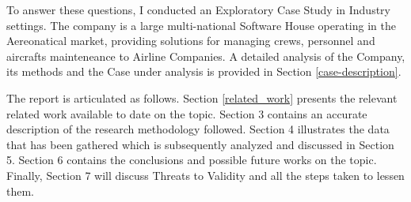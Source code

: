 To answer these questions, I conducted an Exploratory Case Study in Industry settings. The company is a large multi-national Software House operating in the Aereonatical market, providing solutions for managing crews, personnel and aircrafts mainteneance to Airline Companies. A detailed analysis of the Company, its methods and the Case under analysis is provided in Section \ref{case-description}.

The report is articulated as follows. Section \ref{related_work} presents the relevant related work available to date on the topic. Section 3 contains an accurate description of the research methodology followed. Section 4 illustrates the data that has been gathered which is subsequently analyzed and discussed in Section 5. Section 6 contains the conclusions and possible future works on the topic. Finally, Section 7 will discuss Threats to Validity and all the steps taken to lessen them.
